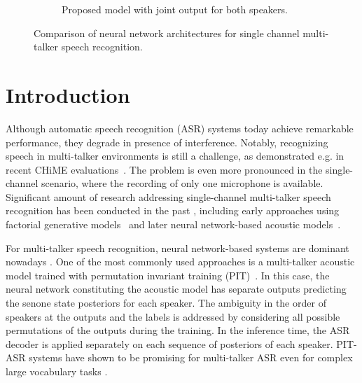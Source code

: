 \documentclass[a4paper]{article}
\newcommand{\spkrA}{a}
\newcommand{\spkrB}{b}
\def\y{{\mathbf y}}
\begin{document}
\begin{figure*}[!ht]
\begin{subfigure}[b]{0.48\textwidth}
        \caption{Proposed model with joint output for both speakers.}
        \label{fig:joint_asr}
    \end{subfigure}
    \caption{Comparison of neural network architectures for single channel multi-talker speech recognition.}
\end{figure*}

\section{Introduction}
\label{sec:intro}
Although automatic speech recognition (ASR) systems today achieve remarkable performance, they degrade in presence of interference. Notably, recognizing speech in multi-talker environments is still a challenge, as demonstrated e.g. in recent CHiME evaluations~\cite{Barker2018,Watanabe2020}. The problem is even more pronounced in the single-channel scenario, where the recording of only one microphone is available. Significant amount of research addressing single-channel multi-talker speech recognition has been conducted in the past \cite{cooke2010monaural,QIAN20181,weng2015}, including early approaches using factorial generative models~\cite{Rennie2010,NIPS2006_67880768} and later neural network-based acoustic models~\cite{QIAN20181,weng2015}.

For multi-talker speech recognition, neural network-based systems are dominant nowadays \cite{QIAN20181,weng2015}. One of the most commonly used approaches is a multi-talker acoustic model trained with permutation invariant training (PIT)~\cite{kolbek2017,QIAN20181}.  In this case, the neural network constituting the acoustic model has separate outputs predicting the senone state posteriors for each speaker. The ambiguity in the order of speakers at the outputs and the labels is addressed by considering all possible permutations of the outputs during the training. In the inference time, the ASR decoder is applied separately on each sequence of posteriors of each speaker. PIT-ASR systems have shown to be promising for multi-talker ASR even for complex large vocabulary tasks \cite{QIAN20181,chang2018monaural}.
\end{document}
